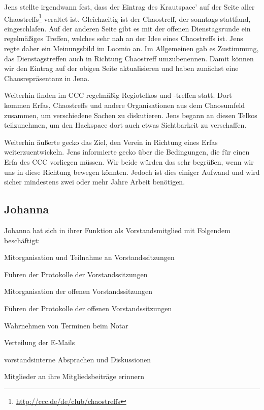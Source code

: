 \documentclass[ngerman]{scrartcl}
\begin{document}
Jens stellte irgendwann fest, dass der Eintrag des Krautspace' auf der Seite
aller Chaostreffs\footnote{\url{http://ccc.de/de/club/chaostreffs}} veraltet
ist. Gleichzeitig ist der Chaostreff, der sonntags stattfand, eingeschlafen. Auf
der anderen Seite gibt es mit der offenen Dienstagsrunde ein regelmäßiges
Treffen, welches sehr nah an der Idee eines Chaostreffs ist. Jens regte daher
ein Meinungsbild im Loomio an. Im Allgemeinen gab es Zustimmung, das
Dienstagstreffen auch in Richtung Chaostreff umzubenennen. Damit können wir den
Eintrag auf der obigen Seite aktualisieren und haben zunächst eine
Chaosrepräsentanz in Jena.

Weiterhin finden im CCC regelmäßig Regiotelkos und -treffen statt. Dort kommen
Erfas, Chaostreffs und andere Organisationen aus dem Chaosumfeld zusammen, um
verschiedene Sachen zu diskutieren. Jens begann an diesen Telkos teilzunehmen,
um den Hackspace dort auch etwas Sichtbarkeit zu verschaffen.

Weiterhin äußerte gecko das Ziel, den Verein in Richtung eines Erfas
weiterzuentwickeln. Jens informierte gecko über die Bedingungen, die für einen
Erfa des CCC vorliegen müssen. Wir beide würden das sehr begrüßen, wenn wir uns
in diese Richtung bewegen könnten. Jedoch ist dies einiger Aufwand und wird
sicher mindestens zwei oder mehr Jahre Arbeit benötigen.

\subsection{Johanna}

Johanna hat sich in ihrer Funktion als Vorstandsmitglied mit Folgendem 
beschäftigt:

\begin{compactitem}
    \item Mitorganisation und Teilnahme an Vorstandssitzungen
    \item Führen der Protokolle der Vorstandssitzungen
    \item Mitorganisation der offenen Vorstandssitzungen
    \item Führen der Protokolle der offenen Vorstandssitzungen
    \item Wahrnehmen von Terminen beim Notar
    \item Verteilung der E-Mails
    \item vorstandsinterne Absprachen und Diskussionen 
    \item Mitglieder an ihre Mitgliedsbeiträge erinnern
\end{compactitem}
\end{document}

